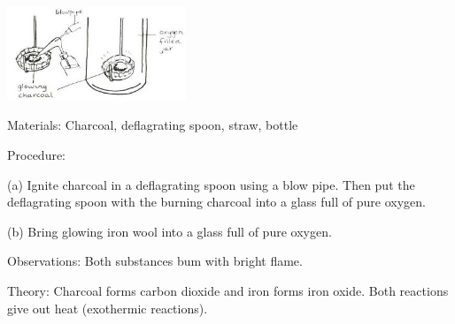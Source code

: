 \begin{multicols}{2}
\begin{center}
\includegraphics[width=0.4\textwidth]{./img/source/burning-oxygen.jpg}
\end{center}

\begin{description*}
\item[Materials:]{Charcoal, deflagrating spoon, straw, bottle}
\item[Procedure:]{(a) Ignite charcoal in a deflagrating spoon
using a blow pipe. Then put the deflagrating
spoon with the burning charcoal into a glass full
of pure oxygen.

(b) Bring glowing iron wool into a glass full of
pure oxygen.}
\item[Observations:]{Both substances bum with bright flame.}
\item[Theory:]{Charcoal forms carbon dioxide and iron
forms iron oxide. Both reactions give out heat
(exothermic reactions).}
\end{description*}



\end{multicols}

\pagebreak